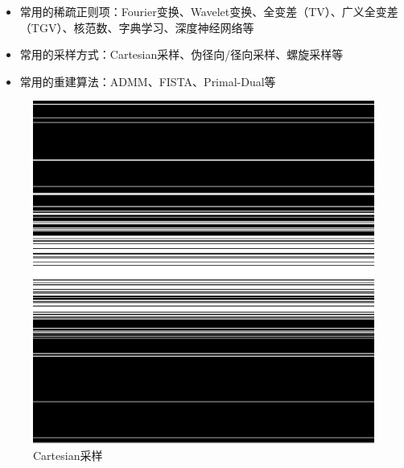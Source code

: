 \documentclass{beamer}
\begin{document}
\begin{frame}
	\begin{itemize}
		\item 常用的稀疏正则项：Fourier变换、Wavelet变换、全变差（TV）、广义全变差（TGV）、核范数、字典学习、深度神经网络等
		\item 常用的采样方式：Cartesian采样、伪径向/径向采样、螺旋采样等
		\item 常用的重建算法：ADMM、FISTA、Primal-Dual等
	\end{itemize}
\begin{figure}[htbp]
\begin{minipage}[t]{0.3\textwidth}
\centering
\includegraphics[width=\textwidth]{../img/intro/cartesian.png}
\\ Cartesian采样
\end{minipage}
\hfill
\begin{minipage}[t]{0.3\textwidth}
\centering

\end{minipage}
\end{figure}
\end{frame}
\end{document}
